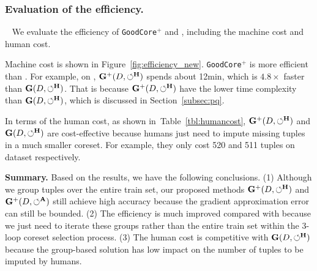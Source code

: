 \subsubsection{Evaluation of the efficiency.}~\label{sec:exp:efficiency_g} We  evaluate the efficiency of \texttt{GoodCore}$^+$ and \ours, including the machine cost and human cost.

 Machine cost is shown  in Figure~\ref{fig:efficiency_new}.  \texttt{GoodCore}$^+$ is more efficient than \ours. For example, on \imdbl, $\mathbf{G}^+(D,\circlearrowleft^\mathbf{H})$ spends about 12min, which is $4.8\times$ faster than $\mathbf{G}(D,\circlearrowleft^\mathbf{H})$. That is because $\mathbf{G}^+(D,\circlearrowleft^\mathbf{H})$ have the lower time complexity than $\mathbf{G}(D,\circlearrowleft^\mathbf{H})$, which is discussed in Section~\ref{subsec:pq}.


 In terms of the human cost, as shown in~Table~\ref{tbl:humancost}, $\mathbf{G}^+(D,\circlearrowleft^\mathbf{H})$ and $\mathbf{G}(D,\circlearrowleft^\mathbf{H})$ are cost-effective because humans just need to impute missing tuples in a much smaller coreset. For example, they only cost 520 and 511 tuples on dataset \imdbl respectively. 

\noindent \textbf{Summary.} 
Based on the results, we have the following conclusions. (1) Although we group tuples over the entire train set, our proposed methods $\mathbf{G}^+(D,\circlearrowleft^\mathbf{H})$ and $\mathbf{G}^+(D,\circlearrowleft^\mathbf{A})$ still achieve high  accuracy because the gradient approximation error can still be bounded. (2) The efficiency is much improved compared with \ours because we just need to iterate these groups rather than  the entire train set within the 3-loop coreset selection process. (3) The human cost is competitive with $\mathbf{G}(D,\circlearrowleft^\mathbf{H})$ because the group-based solution has low impact on the number of tuples to be imputed by humans.

